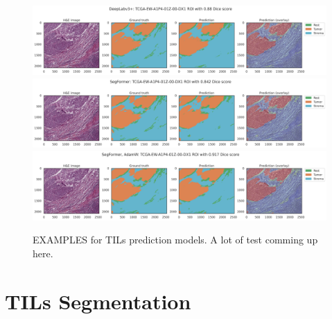 \begin{figure}
\includegraphics[width=\linewidth]{figures/tissue/deeplabv3+_dice_tcga_TCGA-EW-A1P4-01Z-00-DX1.3E9AE553-83D4-4B09-AB7F-D096BCE3BC4D_[8630, 17717, 11173, 19809]_check.png}
\includegraphics[width=\linewidth]{figures/tissue/segformer_dice_tcga_TCGA-EW-A1P4-01Z-00-DX1.3E9AE553-83D4-4B09-AB7F-D096BCE3BC4D_[8630, 17717, 11173, 19809]_check.png}
\includegraphics[width=\linewidth]{figures/tissue/segformer,_adamw_dice_tcga_TCGA-EW-A1P4-01Z-00-DX1.3E9AE553-83D4-4B09-AB7F-D096BCE3BC4D_[8630, 17717, 11173, 19809]_check.png}

\caption{EXAMPLES for TILs prediction models. A lot of test comming up here.}
\label{fig:figure3}
\end{figure}

\section{TILs Segmentation}

